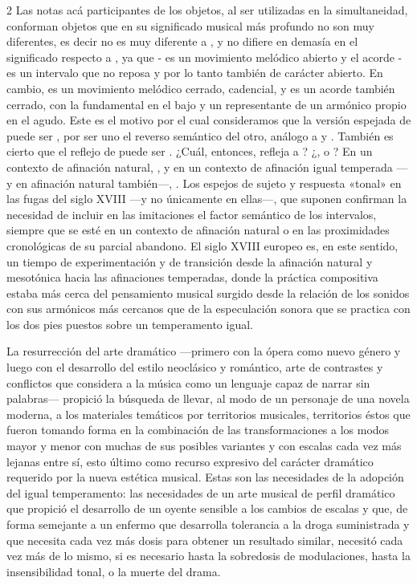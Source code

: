 \documentclass[a4paper,11pt]{article}
\begin{document}
\begin{multicols}{2}
Las notas acá participantes de los objetos, al ser utilizadas en la simultaneidad, conforman objetos que en su significado musical más profundo no son muy diferentes, es decir  no es muy diferente a \hbox{,} y  no difiere en demasía en el significado respecto a \hbox{,} ya que - es un movimiento melódico abierto y el acorde - es un intervalo que no reposa y por lo tanto también de carácter abierto. En cambio,  es un movimiento melódico cerrado, cadencial, y  es un acorde también cerrado, con la fundamental en el bajo y un representante de un armónico propio en el agudo. Este es el motivo por el cual consideramos que la versión espejada de  puede ser , por ser uno el reverso semántico del otro, análogo a  y \hbox{.} También es cierto que el reflejo de  puede ser \hbox{.} ¿Cuál, entonces, refleja a \hbox{?} ¿\hbox{,} o \hbox{?} En un contexto de afinación natural, \hbox{,} y en un contexto de afinación igual temperada ---y en afinación natural también---, \hbox{.} Los espejos de sujeto y respuesta «tonal» en las fugas del siglo XVIII ---y no únicamente en ellas---, que suponen  confirman la necesidad de incluir en las imitaciones el factor semántico de los intervalos, siempre que se esté en un contexto de afinación natural o en las proximidades cronológicas de su parcial abandono. El siglo XVIII europeo es, en este sentido, un tiempo de experimentación y de transición desde la afinación natural y mesotónica hacia las afinaciones temperadas, donde la práctica compositiva estaba más cerca del pensamiento musical surgido desde la relación de los sonidos con sus armónicos más cercanos que de la especulación sonora que se practica con los dos pies puestos sobre un temperamento igual.

La resurrección del arte dramático ---primero con la ópera como nuevo género y luego con el desarrollo del estilo neoclásico y romántico, arte de contrastes y conflictos que considera a la música como un lenguaje capaz de narrar sin palabras--- propició la búsqueda de llevar, al modo de un personaje de una novela moderna, a los materiales temáticos por territorios musicales, territorios éstos que fueron tomando forma en la combinación de las transformaciones a los modos mayor y menor con muchas de sus posibles variantes y con escalas cada vez más lejanas entre sí, esto último como recurso expresivo del carácter dramático requerido por la nueva estética musical. Estas son las necesidades de la adopción del igual temperamento: las necesidades de un arte musical de perfil dramático que propició el desarrollo de un oyente sensible a los cambios de escalas y que, de forma semejante a un enfermo que desarrolla tolerancia a la droga suministrada y que necesita cada vez más dosis para obtener un resultado similar, necesitó cada vez más de lo mismo, si es necesario hasta la sobredosis de modulaciones, hasta la insensibilidad tonal, o la muerte del drama.


\end{multicols}
\end{document}
